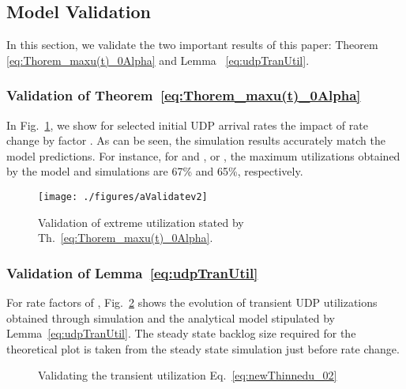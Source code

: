 \documentclass{IEEEtran}
\begin{document}
    \subsection{Model Validation}\label{subsec:modelValidate}
    In this section, we validate the two important results of this paper: Theorem \ref{eq:Thorem_maxu(t)_0Alpha} and Lemma ~\ref{eq:udpTranUtil}.

    \subsubsection{Validation of Theorem~\ref{eq:Thorem_maxu(t)_0Alpha}}
In Fig.~\ref{fig:uChokeTransient}, we show for selected initial UDP arrival rates the impact of rate change by factor . As can be seen, the simulation results accurately match the model predictions. For instance, for  and , or , the maximum utilizations obtained by the model and simulations are 67\% and 65\%, respectively.


    \begin{figure}[thb!]
            \centering
            \texttt{[image: ./figures/aValidatev2]}\caption{Validation of extreme utilization stated by Th.~\ref{eq:Thorem_maxu(t)_0Alpha}.}
            \label{fig:uChokeTransient}
    \end{figure}

\vspace{5mm}

    \subsubsection{Validation of Lemma~\ref{eq:udpTranUtil}}
For rate factors of , Fig.~\ref{fig:validateTh1} shows the evolution of transient UDP utilizations obtained through simulation and the analytical model stipulated by Lemma~\ref{eq:udpTranUtil}. The steady state backlog size  required for the theoretical plot is taken from the steady state simulation just before rate change.

    \begin{figure}[htb!]\centering
          \vspace{2mm}
          \vspace{2mm}
          \vspace{2mm}
          \caption{Validating the transient utilization Eq.~\eqref{eq:newThinnedu_02}}
\label{fig:validateTh1}
     \end{figure}
\end{document}
